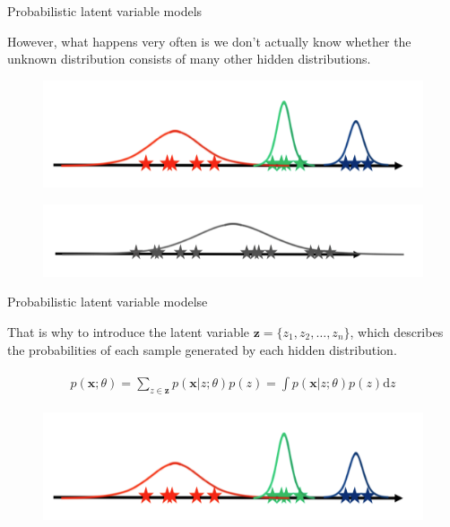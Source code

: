 \documentclass{beamer}		%
\newcommand{\dd}{\mathrm{d}}
\begin{document}
\begin{frame}{Probabilistic latent variable models}

However, what happens very often is we don't actually know whether the unknown distribution consists of many other hidden distributions.

\begin{figure}[t]
\centerline{\includegraphics[width=0.7\linewidth]{figure2.png}}
\vspace{-10pt}
\label{fig1}
\end{figure}

\begin{figure}[t]
\centerline{\includegraphics[width=0.7\linewidth]{figure3.png}}
\vspace{-10pt}
\label{fig1}
\end{figure}
    
\end{frame}



\begin{frame}{Probabilistic latent variable modelse}

That is why to introduce the latent variable $\bm{z} = \{z_1, z_2, \ldots, z_n\}$, which describes the probabilities of each sample generated by each hidden distribution.

\begin{eqnarray*}
\begin{aligned}
p(\bm{x};\theta) = \sum_{z\in\bm{z}} p(\bm{x}|z;\theta)p(z)  = \int p(\bm{x}|z;\theta)p(z)\dd z 
\end{aligned}    
\end{eqnarray*}

\begin{figure}[t]
\centerline{\includegraphics[width=0.7\linewidth]{figure2.png}}
\vspace{-10pt}
\label{fig1}
\end{figure}
    
\end{frame}
\end{document}
